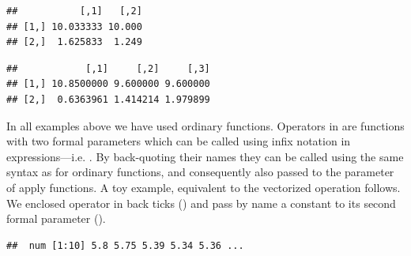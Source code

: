 \documentclass[krantz2]{krantz}\usepackage{knitr}%
\begin{document}
\begin{knitrout}\footnotesize
{}\color{fgcolor}\begin{kframe}
\begin{alltt}
 \hlkwb{<-} \hlstd{(}   \hlstd{=} \hlstd{,}    \hlstd{=} \hlstd{)}
\end{alltt}
\begin{verbatim}
##           [,1]   [,2]
## [1,] 10.033333 10.000
## [2,]  1.625833  1.249
\end{verbatim}
\end{kframe}
\end{knitrout}

\begin{knitrout}\footnotesize
{}\color{fgcolor}\begin{kframe}
\begin{alltt}
 \hlkwb{<-} \hlstd{(}   \hlstd{=} \hlstd{,}    \hlstd{=} \hlstd{)}
\end{alltt}
\begin{verbatim}
##            [,1]     [,2]     [,3]
## [1,] 10.8500000 9.600000 9.600000
## [2,]  0.6363961 1.414214 1.979899
\end{verbatim}
\end{kframe}
\end{knitrout}

In all examples above we have used ordinary functions. Operators in \Rlang are functions with two formal parameters which can be called using infix notation in expressions---i.e. . By back-quoting their names they can be called using the same syntax as for ordinary functions, and consequently also passed to the  parameter of apply functions. A toy example, equivalent to the vectorized operation  follows. We enclosed operator \code{+} in back ticks () and pass by name a constant to its second formal parameter ().

\begin{knitrout}\footnotesize
{}\color{fgcolor}\begin{kframe}
\begin{alltt}
\hlstd{(}\hlstd{)} 
 \hlkwb{<-} \hlstd{(}\hlstd{)}
 \hlkwb{<-} \hlstd{(}     \hlstd{=} \hlstd{)}
\end{alltt}
\begin{verbatim}
##  num [1:10] 5.8 5.75 5.39 5.34 5.36 ...
\end{verbatim}
\end{kframe}
\end{knitrout}
\end{document}
